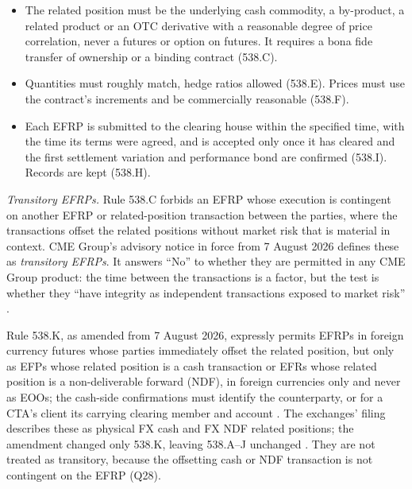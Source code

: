 \begin{qfconvention}
\begin{itemize}
\item The related position must be the underlying cash commodity, a by-product, a related product or an OTC derivative with a reasonable degree of price correlation, never a futures or option on futures. It requires a bona fide transfer of ownership or a binding contract (538.C).
\item Quantities must roughly match, hedge ratios allowed (538.E). Prices must use the contract's increments and be commercially reasonable (538.F).
\item Each EFRP is submitted to the clearing house within the specified time, with the time its terms were agreed, and is accepted only once it has cleared and the first settlement variation and performance bond are confirmed (538.I). Records are kept (538.H).
\end{itemize}
\emph{Transitory EFRPs.} Rule 538.C forbids an EFRP whose execution is contingent on another EFRP or related-position transaction between the parties, where the transactions offset the related positions without market risk that is material in context. CME Group's advisory notice in force from 7 August 2026 defines these as \emph{transitory EFRPs}. It answers ``No'' to whether they are permitted in any CME Group product: the time between the transactions is a factor, but the test is whether they ``have integrity as independent transactions exposed to market risk'' \citep[pp.~4 and~10, Q14]{cme-ra2607-5}.

Rule 538.K, as amended from 7 August 2026, expressly permits EFRPs in foreign currency futures whose parties immediately offset the related position, but only as EFPs whose related position is a cash transaction or EFRs whose related position is a non-deliverable forward (NDF), in foreign currencies only and never as EOOs; the cash-side confirmations must identify the counterparty, or for a CTA's client its carrying clearing member and account \citep[Rule~538.K]{cme-rulebook-ch5}. The exchanges' filing describes these as physical FX cash and FX NDF related positions; the amendment changed only 538.K, leaving 538.A--J unchanged \citep[pp.~1--3, Exhibit~A blackline]{cme-ra2607-5}. They are not treated as transitory, because the offsetting cash or NDF transaction is not contingent on the EFRP (Q28).


\end{qfconvention}
